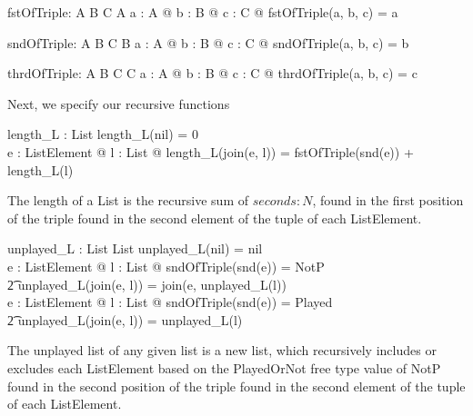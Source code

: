 \documentclass[a4paper,10pt,fleqn]{article}
\begin{document}
\bigskip


\bigskip

\setlength{\leftskip}{\dimexpr\parindent+2em\relax}
\begin{gendef}[A, B, C]
  fstOfTriple: A \cross B \cross C \fun A
\where
  \forall a : A @ \forall b : B @ \forall c : C @ fstOfTriple(a, b, c) = a
\end{gendef}

\begin{gendef}[A, B, C]
  sndOfTriple: A \cross B \cross C \fun B
\where
  \forall a : A @ \forall b : B @ \forall c : C @ sndOfTriple(a, b, c) = b
\end{gendef}

\begin{gendef}[A, B, C]
  thrdOfTriple: A \cross B \cross C \fun C
\where
  \forall a : A @ \forall b : B @ \forall c : C @ thrdOfTriple(a, b, c) = c
\end{gendef}

\noindent Next, we specify our recursive functions

\bigskip

\begin{axdef}
length\_L : List \fun \nat
\where
length\_L(nil) = 0 \\
\forall e : ListElement @ \forall l : List @ length\_L(join(e, l)) = fstOfTriple(snd(e)) + length\_L(l)
\end{axdef}

\noindent The length of a List is the recursive sum of $seconds : N$, found in the first position of the triple found in the second element of the tuple of each ListElement.

\bigskip

\begin{axdef}
unplayed\_L : List \fun List
\where
unplayed\_L(nil) = nil \\
\forall e : ListElement @ \forall l : List @ sndOfTriple(snd(e)) = NotP \implies \\
\t2 unplayed\_L(join(e, l)) = join(e, unplayed\_L(l)) \\
\forall e : ListElement @ \forall l : List @ sndOfTriple(snd(e)) = Played \implies \\
\t2 unplayed\_L(join(e, l)) = unplayed\_L(l)
\end{axdef}

\noindent The unplayed list of any given list is a new list, which recursively includes or excludes each ListElement based on the PlayedOrNot free type value of NotP found in the second position of the triple found in the second element of the tuple of each ListElement. 
\end{document}

